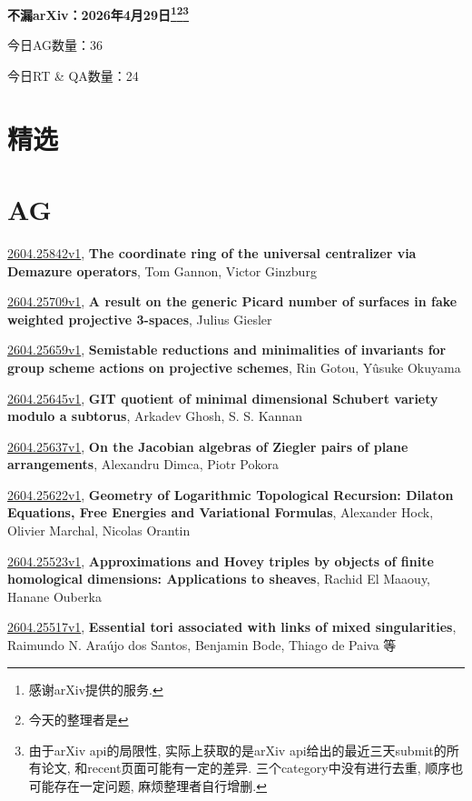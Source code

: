 \documentclass[9pt, a4paper]{article}
\theoremstyle{plain}
\theoremstyle{definition}
\theoremstyle{remark}
\newcommand{\arxiv}[3]{\href{https://arxiv.org/abs/#1}{#1}, \textbf{\textcolor{arxivblue}{#2}}, #3}
\newcommand{\AGnumber}{36}
\newcommand{\RTQAnumber}{24}
\newcommand{\NewestDate}{2026年4月29日}
\newcommand{\todayarXiver}{} %
\begin{document}
\begin{center}
    \Huge\textbf{不漏arXiv：\NewestDate\footnote{感谢arXiv提供的服务.}\footnote{今天的整理者是\todayarXiver}\footnote{由于arXiv api的局限性, 实际上获取的是arXiv api给出的最近三天submit的所有论文, 和recent页面可能有一定的差异. 三个category中没有进行去重, 顺序也可能存在一定问题, 麻烦整理者自行增删.}} \\
\end{center}

\setcounter{section}{-1}

\begin{center}
    今日AG数量：\AGnumber
    
    今日RT \& QA数量：\RTQAnumber
    
\end{center}


\section{精选}


\section{AG}
\arxiv{2604.25842v1}{The coordinate ring of the universal centralizer via Demazure operators}{Tom Gannon, Victor Ginzburg}

\arxiv{2604.25709v1}{A result on the generic Picard number of surfaces in fake weighted projective 3-spaces}{Julius Giesler}

\arxiv{2604.25659v1}{Semistable reductions and minimalities of invariants for group scheme actions on projective schemes}{Rin Gotou, Yûsuke Okuyama}

\arxiv{2604.25645v1}{GIT quotient of minimal dimensional Schubert variety modulo a subtorus}{Arkadev Ghosh, S. S. Kannan}

\arxiv{2604.25637v1}{On the Jacobian algebras of Ziegler pairs of plane arrangements}{Alexandru Dimca, Piotr Pokora}

\arxiv{2604.25622v1}{Geometry of Logarithmic Topological Recursion: Dilaton Equations, Free Energies and Variational Formulas}{Alexander Hock, Olivier Marchal, Nicolas Orantin}

\arxiv{2604.25523v1}{Approximations and Hovey triples by objects of finite homological dimensions: Applications to sheaves}{Rachid El Maaouy, Hanane Ouberka}

\arxiv{2604.25517v1}{Essential tori associated with links of mixed singularities}{Raimundo N. Araújo dos Santos, Benjamin Bode, Thiago de Paiva 等}
\end{document}
